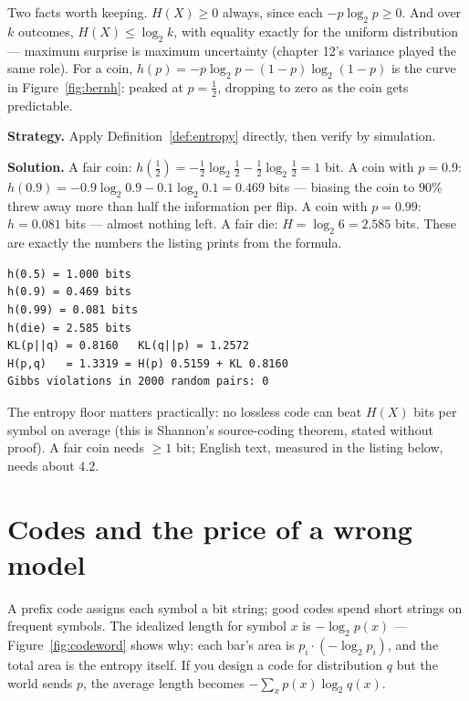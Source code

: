 Two facts worth keeping. $H(X)\ge 0$ always, since each
$-p\log_2 p\ge0$. And over $k$ outcomes, $H(X)\le\log_2 k$, with
equality exactly for the uniform distribution --- maximum surprise is
maximum uncertainty (chapter 12's variance played the same role). For a
coin, $h(p)=-p\log_2 p-(1-p)\log_2(1-p)$ is the curve in
Figure~\ref{fig:bernh}: peaked at $p=\tfrac12$, dropping to zero as the
coin gets predictable.

\begin{example}\label{ex:coinentropy}
\textbf{Strategy.} Apply Definition~\ref{def:entropy} directly, then
verify by simulation.

\textbf{Solution.}
A fair coin: $h(\tfrac12)= -\tfrac12\log_2\tfrac12
-\tfrac12\log_2\tfrac12 = 1$ bit. A coin with $p=0.9$:
$h(0.9)=-0.9\log_2 0.9 - 0.1\log_2 0.1 = 0.469$ bits --- biasing the
coin to 90\% threw away more than half the information per flip. A coin
with $p=0.99$: $h=0.081$ bits --- almost nothing left. A fair die:
$H=\log_2 6 = 2.585$ bits. These are exactly the numbers the listing
prints from the formula.

\begin{lstlisting}[caption={\ttfamily code/ch15\_info.py run ---
coin/die entropies, both KL directions, and Gibbs verified on
2000 random pairs.},abovecaptionskip=0pt]
h(0.5) = 1.000 bits
h(0.9) = 0.469 bits
h(0.99) = 0.081 bits
h(die) = 2.585 bits
KL(p||q) = 0.8160   KL(q||p) = 1.2572
H(p,q)   = 1.3319 = H(p) 0.5159 + KL 0.8160
Gibbs violations in 2000 random pairs: 0
\end{lstlisting}
\end{example}

The entropy floor matters practically: no lossless code can beat
$H(X)$ bits per symbol on average (this is Shannon's source-coding
theorem, stated without proof). A fair coin needs $\ge1$ bit; English
text, measured in the listing below, needs about $4.2$.

\section{Codes and the price of a wrong model}\label{sec:info-codes}

A prefix code assigns each symbol a bit string; good codes spend short
strings on frequent symbols. The idealized length for symbol $x$ is
$-\log_2 p(x)$ --- Figure~\ref{fig:codeword} shows why: each bar's
area is $p_i\cdot(-\log_2 p_i)$, and the total area is the entropy
itself. If you design a code for distribution $q$ but the world sends
$p$, the average length becomes $-\sum_{x} p(x)\log_2 q(x)$.

